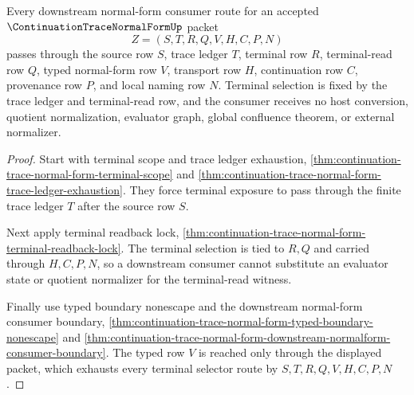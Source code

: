 \begin{theorem}
\label{thm:continuation-trace-normal-form-terminal-selector-totality}
Every downstream normal-form consumer route for an accepted $\ContinuationTraceNormalFormUp$ packet
$$
Z=(S,T,R,Q,V,H,C,P,N)
$$
passes through the source row $S$, trace ledger $T$, terminal row $R$, terminal-read row $Q$, typed normal-form row $V$, transport row $H$, continuation row $C$, provenance row $P$, and local naming row $N$. Terminal selection is fixed by the trace ledger and terminal-read row, and the consumer receives no host conversion, quotient normalization, evaluator graph, global confluence theorem, or external normalizer.
\end{theorem}
\begin{proof}
Start with terminal scope and trace ledger exhaustion, \autoref{thm:continuation-trace-normal-form-terminal-scope} and \autoref{thm:continuation-trace-normal-form-trace-ledger-exhaustion}. They force terminal exposure to pass through the finite trace ledger $T$ after the source row $S$.

Next apply terminal readback lock, \autoref{thm:continuation-trace-normal-form-terminal-readback-lock}. The terminal selection is tied to $R,Q$ and carried through $H,C,P,N$, so a downstream consumer cannot substitute an evaluator state or quotient normalizer for the terminal-read witness.

Finally use typed boundary nonescape and the downstream normal-form consumer boundary, \autoref{thm:continuation-trace-normal-form-typed-boundary-nonescape} and \autoref{thm:continuation-trace-normal-form-downstream-normalform-consumer-boundary}. The typed row $V$ is reached only through the displayed packet, which exhausts every terminal selector route by $S,T,R,Q,V,H,C,P,N$.
\end{proof}

